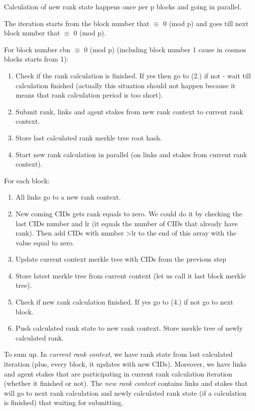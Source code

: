 \documentclass[8pt,oneside]{amsart}
\newcommand{\code}[1]{{\PlayBold #1}}
\begin{document}
Calculation of new rank state happens once per \code{p} blocks and going in parallel.

The iteration starts from the block number that \code{$\equiv$ 0 (mod p)} and goes till next block number that \code{$\equiv$ 0 (mod p)}.

For block number \code{cbn $\equiv$ 0 (mod p)} (including block number 1 cause in cosmos blocks starts from 1):

\begin{enumerate}
  \item Check if the rank calculation is finished. If yes then go to (2.) if not - wait till calculation finished
  (actually this situation should not happen because it means that rank calculation period is too short).
  \item Submit rank, links and agent stakes from new rank context to current rank context.
  \item Store last calculated rank merkle tree root hash.
  \item Start new rank calculation in parallel (on links and stakes from current rank context).
\end{enumerate}

For each block:

\begin{enumerate}
  \item All links go to a new rank context.
  \item New coming CIDs gets rank equals to zero. We could do it by checking the last CIDs number and \code{lr} (it equals the number of CIDs that already have rank). Then add CIDs with number \code{>lr} to the end of this array with the value equal to zero.
  \item Update current context merkle tree with CIDs from the previous step
  \item Store latest merkle tree from current context (let us call it last block merkle tree).
  \item Check if new rank calculation finished. If yes go to (4.) if not go to next block.
  \item Push calculated rank state to new rank context. Store merkle tree of newly calculated rank.
\end{enumerate}
To sum up. In \textit{current rank context}, we have rank state from last calculated iteration (plus, every block, it updates with new CIDs). Moreover, we have links and agent stakes that are participating in current rank calculation iteration (whether it finished or not). The \textit{new rank context} contains links and stakes that will go to next rank calculation and newly calculated rank state (if a calculation is finished) that waiting for submitting.
\end{document}
